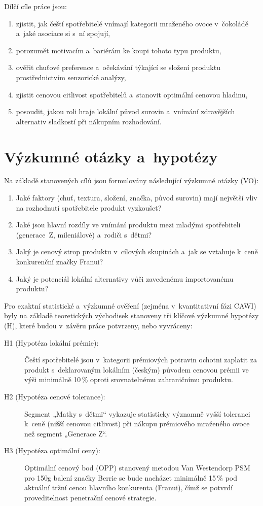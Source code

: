 Dílčí cíle práce jsou:
\begin{enumerate}
  \item zjistit, jak čeští spotřebitelé vnímají kategorii mraženého ovoce v~čokoládě a~jaké asociace si s~ní spojují,
  \item porozumět motivacím a~bariérám ke koupi tohoto typu produktu,
  \item ověřit chuťové preference a~očekávání týkající se složení produktu prostřednictvím senzorické analýzy,
  \item zjistit cenovou citlivost spotřebitelů a~stanovit optimální cenovou hladinu,
  \item posoudit, jakou roli hraje lokální původ surovin a~vnímání zdravějších alternativ sladkostí při nákupním rozhodování.
\end{enumerate}

\section{Výzkumné otázky a~hypotézy}
\label{sec:intro_rq_hyp}

Na základě stanovených cílů jsou formulovány následující výzkumné otázky (VO):
\begin{enumerate}
  \item[\textbf{VO1}] Jaké faktory (chuť, textura, složení, značka, původ surovin) mají největší vliv na rozhodnutí spotřebitele produkt vyzkoušet?
  \item[\textbf{VO2}] Jaké jsou hlavní rozdíly ve vnímání produktu mezi mladými spotřebiteli (generace~Z, mileniálové) a~rodiči s~dětmi?
  \item[\textbf{VO3}] Jaký je cenový strop produktu v~cílových skupinách a~jak se vztahuje k~ceně konkurenční značky Franui?
  \item[\textbf{VO4}] Jaký je potenciál lokální alternativy vůči zavedenému importovanému produktu?
\end{enumerate}

Pro exaktní statistické a~výzkumné ověření (zejména v~kvantitativní fázi CAWI) byly na základě teoretických východisek stanoveny tři klíčové výzkumné hypotézy (H), které budou v~závěru práce potvrzeny, nebo vyvráceny:

\begin{description}
  \item[H1 (Hypotéza lokální prémie):] Čeští spotřebitelé jsou v~kategorii prémiových potravin ochotni zaplatit za produkt s~deklarovaným lokálním (českým) původem cenovou prémii ve výši minimálně 10\,\% oproti srovnatelnému zahraničnímu produktu.
  \item[H2 (Hypotéza cenové tolerance):] Segment „Matky s~dětmi“ vykazuje statisticky významně vyšší toleranci k~ceně (nižší cenovou citlivost) při nákupu prémiového mraženého ovoce než segment „Generace Z“.
  \item[H3 (Hypotéza optimální ceny):] Optimální cenový bod (OPP) stanovený metodou Van Westendorp PSM pro 150g balení značky Berrie se bude nacházet minimálně 15\,\% pod aktuální tržní cenou hlavního konkurenta (Franui), čímž se potvrdí proveditelnost penetrační cenové strategie.
\end{description}

